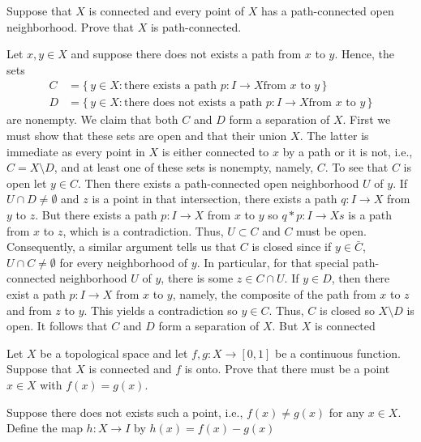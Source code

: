 \begin{problem}
  Suppose that \(X\) is connected and every point of \(X\) has a
  path-connected open neighborhood. Prove that \(X\) is path-connected.
\end{problem}
\begin{solution}
  Let \(x,y\in X\) and suppose there does not exists a path from \(x\) to
  \(y\). Hence, the sets
  \begin{align*}
    C&=\bigl\{\,y\in X:\text{there exists a path \(p\colon I\to X\)
       from \(x\) to \(y\)}\,\bigr\}\\
    D&=\bigl\{\,y\in X:\text{there does not exists a path \(p\colon I\to X\)
       from \(x\) to \(y\)}\,\bigr\}
  \end{align*}
  are nonempty. We claim that both \(C\) and \(D\) form a separation of
  \(X\). First we must show that these sets are open and that their union
  \(X\). The latter is immediate as every point in \(X\) is either
  connected to \(x\) by a path or it is not, i.e., \(C=X\setminus D\), and
  at least one of these sets is nonempty, namely, \(C\). To see that \(C\)
  is open let \(y\in C\). Then there exists a path-connected open
  neighborhood \(U\) of \(y\). If \(U\cap D\neq\emptyset\) and \(z\) is a
  point in that intersection, there exists a path \(q\colon I\to X\) from
  \(y\) to \(z\). But there exists a path \(p\colon I\to X\) from \(x\) to
  \(y\) so \(q*p\colon I\to Xs\) is a path from \(x\) to \(z\), which is a
  contradiction. Thus, \(U\subset C\) and \(C\) must be open. Consequently,
  a similar argument tells us that \(C\) is closed since if \(y\in\bar C\),
  \(U\cap C\neq\emptyset\) for every neighborhood of \(y\). In particular,
  for that special path-connected neighborhood \(U\) of \(y\), there is
  some \(z\in C\cap U\). If \(y\in D\), then there exist a path
  \(p\colon I\to X\) from \(x\) to \(y\), namely, the composite of the path
  from \(x\) to \(z\) and from \(z\) to \(y\). This yields a contradiction
  so \(y\in C\). Thus, \(C\) is closed so \(X\setminus D\) is open. It
  follows that \(C\) and \(D\) form a separation of \(X\). But \(X\) is
  connected
\end{solution}

\begin{problem}
  Let \(X\) be a topological space and let \(f,g\colon X\to[0,1]\) be a
  continuous function. Suppose that \(X\) is connected and \(f\) is
  onto. Prove that there must be a point \(x\in X\) with \(f(x)=g(x)\).
\end{problem}
\begin{solution}
  Suppose there does not exists such a point, i.e., \(f(x)\neq g(x)\) for
  any \(x\in X\). Define the map \(h\colon X\to I\) by \(h(x)=f(x)-g(x)\)
\end{solution}

